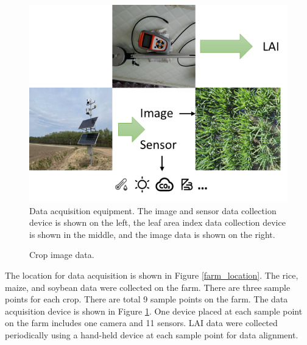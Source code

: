 \documentclass[acmsmall, screen]{acmart}
\begin{document}
\begin{figure}[htbp]
  \centering
  \includegraphics[width=0.5\linewidth]{pic/data_acquisition_equipment.png}
  \caption{Data acquisition equipment. The image and sensor data collection device is shown on the left, the leaf area index data collection device is shown in the middle, and the image data is shown on the right.}
  \label{data_collection_equipment}
\end{figure}


\begin{figure}[htbp]
  \centering
  \hfill
  \caption{Crop image data.}
  \label{crop}
\end{figure}

The location for data acquisition is shown in Figure \ref{farm_location}. The rice, maize, and soybean data were collected on the farm. There are three sample points for each crop. There are total 9 sample points on the farm. The data acquisition device is shown in Figure \ref{data_collection_equipment}. One device placed at each sample point on the farm includes one camera and 11 sensors. LAI data were collected periodically using a hand-held device at each sample point for data alignment.
\end{document}
